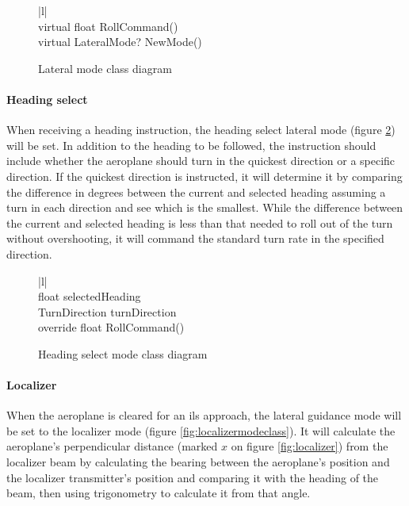 \documentclass{article}
\begin{document}
\begin{figure}[H]
\centering
\begin{tabular}{ |l| } 
\hline
{} \\
\hline
virtual float RollCommand() \\
virtual LateralMode? NewMode() \\
\hline
\end{tabular}
\caption{\label{fig:lateralmodeclass}Lateral mode class diagram}
\end{figure}

\paragraph{Heading select}
When receiving a heading instruction, the heading select lateral mode (figure \ref{fig:headingselectmodeclass}) will be set.
In addition to the heading to be followed, the instruction should include whether the aeroplane should turn in the quickest direction or a specific direction.
If the quickest direction is instructed, it will determine it by comparing the difference in degrees between the current and selected heading assuming a turn in each direction and see which is the smallest.
While the difference between the current and selected heading is less than that needed to roll out of the turn without overshooting, it will command the standard turn rate in the specified direction.

\begin{figure}[H]
\centering
\begin{tabular}{ |l| } 
\hline
{} \\
\hline
float selectedHeading \\
TurnDirection turnDirection \\
\hline
override float RollCommand() \\
\hline
\end{tabular}
\caption{\label{fig:headingselectmodeclass}Heading select mode class diagram}
\end{figure}

\paragraph{Localizer}
When the aeroplane is cleared for an \acrshort{ils} approach, the lateral guidance mode will be set to the localizer mode (figure \ref{fig:localizermodeclass}).
It will calculate the aeroplane's perpendicular distance (marked $x$ on figure \ref{fig:localizer}) from the localizer beam by calculating the bearing between the aeroplane's position and the localizer transmitter's position and comparing it with the \gls{heading} of the beam, then using trigonometry to calculate it from that angle.
\end{document}
